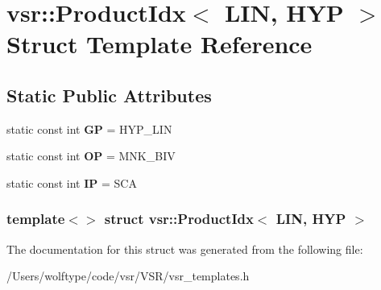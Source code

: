 \hypertarget{structvsr_1_1_product_idx_3_01_l_i_n_00_01_h_y_p_01_4}{\section{vsr\-:\-:Product\-Idx$<$ L\-I\-N, H\-Y\-P $>$ Struct Template Reference}
\label{structvsr_1_1_product_idx_3_01_l_i_n_00_01_h_y_p_01_4}
}
\subsection*{Static Public Attributes}
\begin{DoxyCompactItemize}
\item 
\hypertarget{structvsr_1_1_product_idx_3_01_l_i_n_00_01_h_y_p_01_4_a136fc8c4e4d2ab9411ade4d7a3852cb1}{static const int {\bfseries G\-P} = H\-Y\-P\-\_\-\-L\-I\-N}\label{structvsr_1_1_product_idx_3_01_l_i_n_00_01_h_y_p_01_4_a136fc8c4e4d2ab9411ade4d7a3852cb1}

\item 
\hypertarget{structvsr_1_1_product_idx_3_01_l_i_n_00_01_h_y_p_01_4_a8d619a86682ac4a167dba126b7120815}{static const int {\bfseries O\-P} = M\-N\-K\-\_\-\-B\-I\-V}\label{structvsr_1_1_product_idx_3_01_l_i_n_00_01_h_y_p_01_4_a8d619a86682ac4a167dba126b7120815}

\item 
\hypertarget{structvsr_1_1_product_idx_3_01_l_i_n_00_01_h_y_p_01_4_ab23e3ebfe7a0f1d6137ca93e15930c8e}{static const int {\bfseries I\-P} = S\-C\-A}\label{structvsr_1_1_product_idx_3_01_l_i_n_00_01_h_y_p_01_4_ab23e3ebfe7a0f1d6137ca93e15930c8e}

\end{DoxyCompactItemize}
\subsubsection*{template$<$$>$ struct vsr\-::\-Product\-Idx$<$ L\-I\-N, H\-Y\-P $>$}



The documentation for this struct was generated from the following file\-:\begin{DoxyCompactItemize}
\item 
/\-Users/wolftype/code/vsr/\-V\-S\-R/vsr\-\_\-templates.\-h\end{DoxyCompactItemize}
